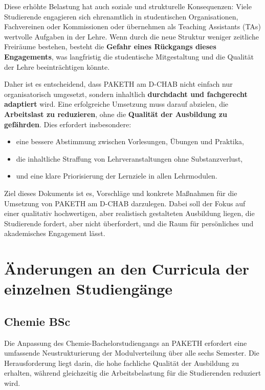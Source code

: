 \documentclass[a4paper]{article}
\begin{document}
Diese erhöhte Belastung hat auch soziale und strukturelle Konsequenzen:  
Viele Studierende engagieren sich ehrenamtlich in studentischen Organisationen, Fachvereinen oder Kommissionen oder übernehmen als Teaching Assistants (TAs) wertvolle Aufgaben in der Lehre.  
Wenn durch die neue Struktur weniger zeitliche Freiräume bestehen, besteht die \textbf{Gefahr eines Rückgangs dieses Engagements}, was langfristig die studentische Mitgestaltung und die Qualität der Lehre beeinträchtigen könnte.  

Daher ist es entscheidend, dass PAKETH am D-CHAB nicht einfach nur organisatorisch umgesetzt, sondern inhaltlich \textbf{durchdacht und fachgerecht adaptiert} wird.  
Eine erfolgreiche Umsetzung muss darauf abzielen, die \textbf{Arbeitslast zu reduzieren}, ohne die \textbf{Qualität der Ausbildung zu gefährden}.  
Dies erfordert insbesondere:
\begin{itemize}[leftmargin=2em]
    \item eine bessere Abstimmung zwischen Vorlesungen, Übungen und Praktika,
    \item die inhaltliche Straffung von Lehrveranstaltungen ohne Substanzverlust,
    \item und eine klare Priorisierung der Lernziele in allen Lehrmodulen.
\end{itemize}

Ziel dieses Dokuments ist es, Vorschläge und konkrete Maßnahmen für die Umsetzung von PAKETH am D-CHAB darzulegen.  
Dabei soll der Fokus auf einer qualitativ hochwertigen, aber realistisch gestalteten Ausbildung liegen, die Studierende fordert, aber nicht überfordert, und die Raum für persönliches und akademisches Engagement lässt.

\section{Änderungen an den Curricula der einzelnen Studiengänge}

\subsection{Chemie BSc}

Die Anpassung des Chemie-Bachelorstudiengangs an PAKETH erfordert eine umfassende Neustrukturierung der Modulverteilung über alle sechs Semester. Die Herausforderung liegt darin, die hohe fachliche Qualität der Ausbildung zu erhalten, während gleichzeitig die Arbeitsbelastung für die Studierenden reduziert wird.
\end{document}
